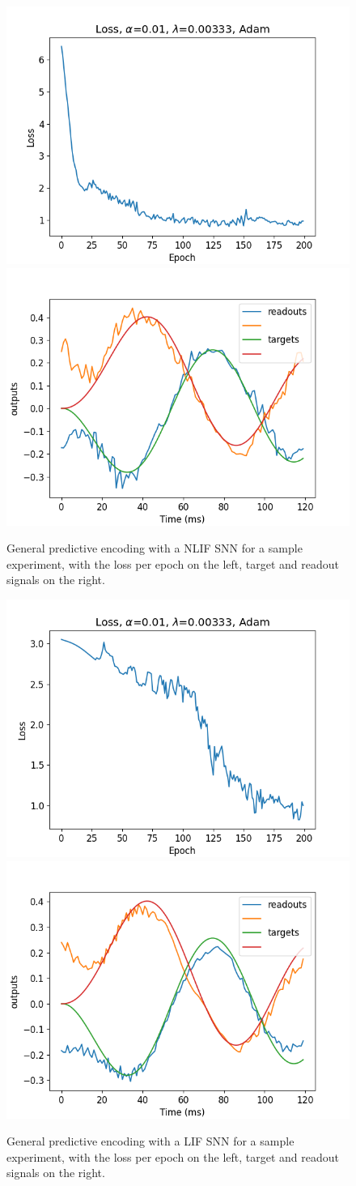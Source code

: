 \documentclass[mphil,deptreport,ianc]{infthesis} %
\begin{document}
\begin{figure}
    \centering
    \includegraphics[width=0.49\columnwidth]{figures/Gating/GeneralPredictiveEncoding/NLIF_sample/plot_loss_test_mt_NLIF_et_GeneralPredictiveEncoding_N_30_titers_200.png}
    \includegraphics[width=0.49\columnwidth]{figures/Gating/GeneralPredictiveEncoding/NLIF_sample/test_plot_outputs_NLIF_seed_25.png}
    \caption{General predictive encoding with a NLIF SNN for a sample experiment, with the loss per epoch on the left, target and readout signals on the right.}
    \label{fig:general_predictive_NLIF}
\end{figure}

\begin{figure}
    \centering
    \includegraphics[width=0.49\columnwidth]{figures/Gating/GeneralPredictiveEncoding/LIF_sample/plot_loss_test_mt_LIF_et_GeneralPredictiveEncoding_N_30_titers_200.png}
    \includegraphics[width=0.49\columnwidth]{figures/Gating/GeneralPredictiveEncoding/LIF_sample/test_plot_outputs_LIF_seed_24.png}
    \caption{General predictive encoding with a LIF SNN for a sample experiment, with the loss per epoch on the left, target and readout signals on the right.}
    \label{fig:general_predictive_LIF}
\end{figure}
\end{document}
